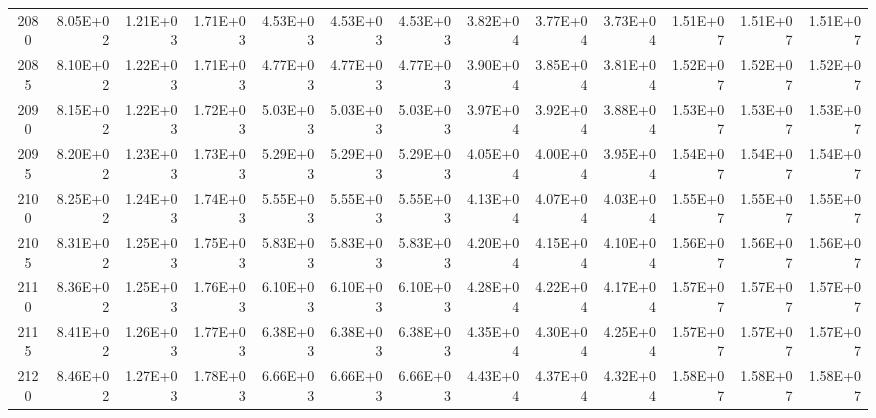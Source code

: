 \documentclass{article}
\begin{document}
\begin{table}
\begin{tabular}{crrr|rrr|rrr|rrr}
2080     & 8.05E+02  & 1.21E+03  & 1.71E+03  & 4.53E+03  & 4.53E+03  & 4.53E+03  & 3.82E+04  & 3.77E+04  & 3.73E+04  & 1.51E+07  & 1.51E+07  & 1.51E+07  \\
2085     & 8.10E+02  & 1.22E+03  & 1.71E+03  & 4.77E+03  & 4.77E+03  & 4.77E+03  & 3.90E+04  & 3.85E+04  & 3.81E+04  & 1.52E+07  & 1.52E+07  & 1.52E+07  \\
2090     & 8.15E+02  & 1.22E+03  & 1.72E+03  & 5.03E+03  & 5.03E+03  & 5.03E+03  & 3.97E+04  & 3.92E+04  & 3.88E+04  & 1.53E+07  & 1.53E+07  & 1.53E+07  \\
2095     & 8.20E+02  & 1.23E+03  & 1.73E+03  & 5.29E+03  & 5.29E+03  & 5.29E+03  & 4.05E+04  & 4.00E+04  & 3.95E+04  & 1.54E+07  & 1.54E+07  & 1.54E+07  \\
2100     & 8.25E+02  & 1.24E+03  & 1.74E+03  & 5.55E+03  & 5.55E+03  & 5.55E+03  & 4.13E+04  & 4.07E+04  & 4.03E+04  & 1.55E+07  & 1.55E+07  & 1.55E+07  \\
2105     & 8.31E+02  & 1.25E+03  & 1.75E+03  & 5.83E+03  & 5.83E+03  & 5.83E+03  & 4.20E+04  & 4.15E+04  & 4.10E+04  & 1.56E+07  & 1.56E+07  & 1.56E+07  \\
2110     & 8.36E+02  & 1.25E+03  & 1.76E+03  & 6.10E+03  & 6.10E+03  & 6.10E+03  & 4.28E+04  & 4.22E+04  & 4.17E+04  & 1.57E+07  & 1.57E+07  & 1.57E+07  \\
2115     & 8.41E+02  & 1.26E+03  & 1.77E+03  & 6.38E+03  & 6.38E+03  & 6.38E+03  & 4.35E+04  & 4.30E+04  & 4.25E+04  & 1.57E+07  & 1.57E+07  & 1.57E+07  \\
2120     & 8.46E+02  & 1.27E+03  & 1.78E+03  & 6.66E+03  & 6.66E+03  & 6.66E+03  & 4.43E+04  & 4.37E+04  & 4.32E+04  & 1.58E+07  & 1.58E+07  & 1.58E+07 
\end{tabular}
\end{table}
\end{document}
